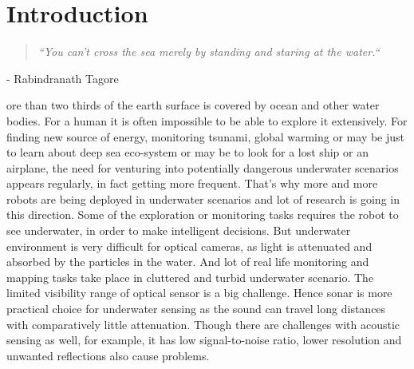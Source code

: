 
\chapter{Introduction}
\newcommand{\chapquote}[3]{\begin{quotation} \textit{#1} \end{quotation} \begin{flushright} - #2\end{flushright} }

\chapquote{``You can't cross the sea merely by standing and staring at the water.``}{Rabindranath Tagore}

More than two thirds of the earth surface is covered by ocean and other water bodies. For a human it is often impossible to be able to explore it extensively. 
For finding new source of energy, monitoring tsunami, global warming or may be just to learn about deep sea eco-system or may be to look for a lost ship or an airplane, the need for venturing into potentially dangerous 
underwater scenarios appears regularly, in fact getting more frequent. That's why more and more robots are being deployed in underwater scenarios and lot of research is going in this direction. 
Some of the exploration or monitoring tasks requires the robot to see underwater, in order to make intelligent decisions.
But underwater environment is very difficult for optical cameras, as light is attenuated and absorbed by the particles in the water. And lot of real life monitoring and mapping 
tasks take place in cluttered and turbid underwater scenario. The limited visibility range of optical sensor is a big challenge. Hence sonar is more practical choice for underwater sensing as the sound can travel 
long distances with comparatively little attenuation. Though there are challenges with acoustic sensing as well, for example, it has low signal-to-noise ratio, lower resolution and unwanted reflections also cause problems. \\

